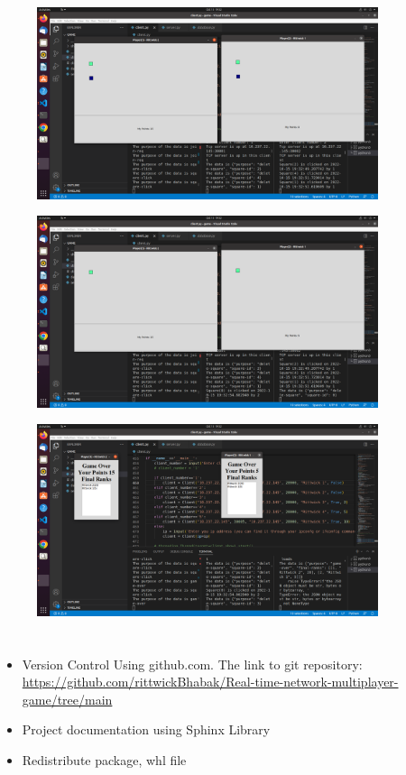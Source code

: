 \documentclass[manuscript,screen,review,nonacm]{acmart}
\begin{document}
\begin{figure}[htp]
    \centering
    \includegraphics[width=10cm]{5.png}
    \caption{}
    \label{fig:galaxy}
\end{figure}

\begin{figure}[htp]
    \centering
    \includegraphics[width=10cm]{6.png}
    \caption{}
    \label{fig:galaxy}
\end{figure}\begin{figure}[htp]
    \centering
    \includegraphics[width=10cm]{7.png}
    \caption{}
    \label{fig:galaxy}
\end{figure}

\vfill
\clearpage
\section{}
\begin{itemize}
    \item Version Control Using github.com. The link to git repository: \href{https://github.com/rittwickBhabak/Real-time-network-multiplayer-game/tree/main}{https://github.com/rittwickBhabak/Real-time-network-multiplayer-game/tree/main}
    \item Project documentation using Sphinx Library
    \item Redistribute package, whl file
\end{itemize}
\end{document}
